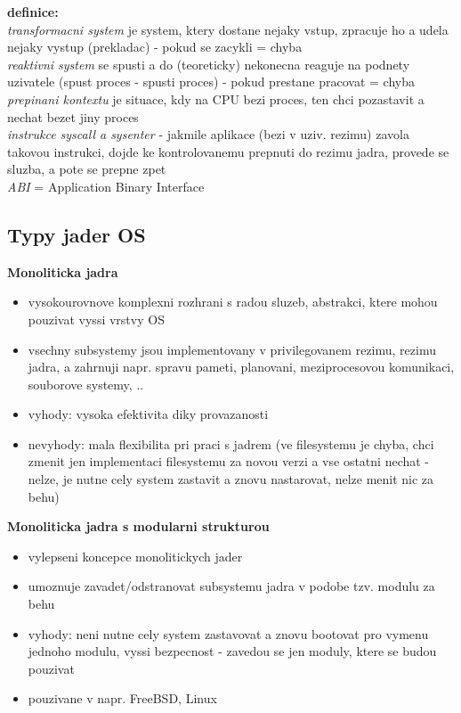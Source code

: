 \documentclass[a4paper, 11pt]{article}
\begin{document}
\noindent\textbf{definice:} \\[0.5em]
\textit{transformacni system} je system, ktery dostane nejaky vstup, zpracuje ho a udela nejaky vystup (prekladac) - pokud se zacykli = chyba \\[0.2em]
\textit{reaktivni system} se spusti a do (teoreticky) nekonecna reaguje na podnety uzivatele (spust proces - spusti proces) - pokud prestane pracovat = chyba \\[0.2em]
\textit{prepinani kontextu} je situace, kdy na CPU bezi proces, ten chci pozastavit a nechat bezet jiny proces \\[0.2em]
\textit{instrukce syscall a sysenter} - jakmile aplikace (bezi v uziv. rezimu) zavola takovou instrukci, dojde ke kontrolovanemu prepnuti do rezimu jadra, provede se sluzba, a pote se prepne zpet \\[0.2em]
\textit{ABI} = Application Binary Interface

\newpage

\subsection{Typy jader OS}

\noindent\textbf{Monoliticka jadra}
\begin{itemize}
    \item vysokourovnove komplexni rozhrani s radou sluzeb, abstrakci, ktere mohou pouzivat vyssi vrstvy OS
    \item vsechny subsystemy jsou implementovany v privilegovanem rezimu, rezimu jadra, a zahrnuji napr. spravu pameti, planovani, meziprocesovou komunikaci, souborove systemy, ..
    \item vyhody: vysoka efektivita diky provazanosti
    \item nevyhody: mala flexibilita pri praci s jadrem (ve filesystemu je chyba, chci zmenit jen implementaci filesystemu za novou verzi a vse ostatni nechat - nelze, je nutne cely system zastavit a znovu nastarovat, nelze menit nic za behu) \\
\end{itemize}

\noindent\textbf{Monoliticka jadra s modularni strukturou}
\begin{itemize}
    \item vylepseni koncepce monolitickych jader
    \item umoznuje zavadet/odstranovat subsystemu jadra v podobe tzv. modulu za behu
    \item vyhody: neni nutne cely system zastavovat a znovu bootovat pro vymenu jednoho modulu, vyssi bezpecnost - zavedou se jen moduly, ktere se budou pouzivat
    \item pouzivane v napr. FreeBSD, Linux \\
\end{itemize}
\end{document}
